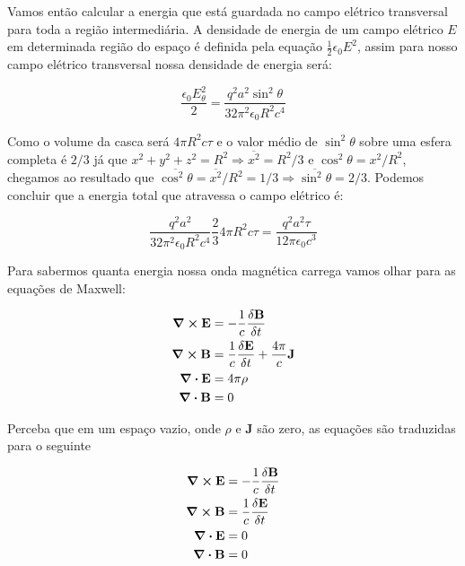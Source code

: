 \documentclass[12pt, letterpaper]{article}
\begin{document}
    Vamos então calcular a energia que está guardada no campo elétrico transversal para toda a região intermediária. A densidade de energia de um campo elétrico $E$ em determinada região do espaço é definida pela equação $\frac{1}{2}\epsilon_0E^2$, assim para nosso campo elétrico transversal nossa densidade de energia será:

    \begin{equation} \label{eq5}
        \frac{\epsilon_0E_\theta^2}{2} = \frac{q^2a^2\sin^2{\theta}}{32\pi^2\epsilon_0R^2c^4}
    \end{equation}    

    Como o volume da casca será $4\pi R^2 c\tau$ e o valor médio de $\sin^2{\theta}$ sobre uma esfera completa é $2/3$ já que $x^2 + y^2 + z^2 = R^2 \Rightarrow \overline{x^2} = R^2/3$ e $\cos^2{\theta} = x^2/R^2$, chegamos ao resultado que $\overline{\cos^2{\theta}} = \overline{x^2} /R^2 = 1/3 \Rightarrow \overline{\sin^2{\theta}} = 2/3$. Podemos concluir que a energia total que atravessa o campo elétrico é:

    \begin{equation} \label{eq6}
        \frac{q^2a^2}{32\pi^2\epsilon_0R^2c^4}\frac{2}{3}4\pi R^2c\tau = \frac{q^2a^2\tau}{12\pi\epsilon_0c^3}
    \end{equation}    

    Para sabermos quanta energia nossa onda magnética carrega vamos olhar para as equações de Maxwell:

    \begin{equation}
    \begin{split}
        \curl\textbf{E} &= -\frac{1}{c}\frac{\delta\textbf{B}}{\delta t} \\
        \curl\textbf{B} &= \frac{1}{c}\frac{\delta\textbf{E}}{\delta t} + \frac{4\pi}{c}\textbf{J} \\
        \div\textbf{E} &= 4\pi\rho \\
        \div\textbf{B} &= 0
    \end{split}
    \end{equation}

    Perceba que em um espaço vazio, onde $\rho$ e $\textbf{J}$ são zero, as equações são traduzidas para o seguinte

    \begin{equation}
    \begin{split}
        \curl\textbf{E} &= -\frac{1}{c}\frac{\delta\textbf{B}}{\delta t} \\
        \curl\textbf{B} &= \frac{1}{c}\frac{\delta\textbf{E}}{\delta t} \\
        \div\textbf{E} &= 0 \\
        \div\textbf{B} &= 0
    \end{split}
    \end{equation}
\end{document}
